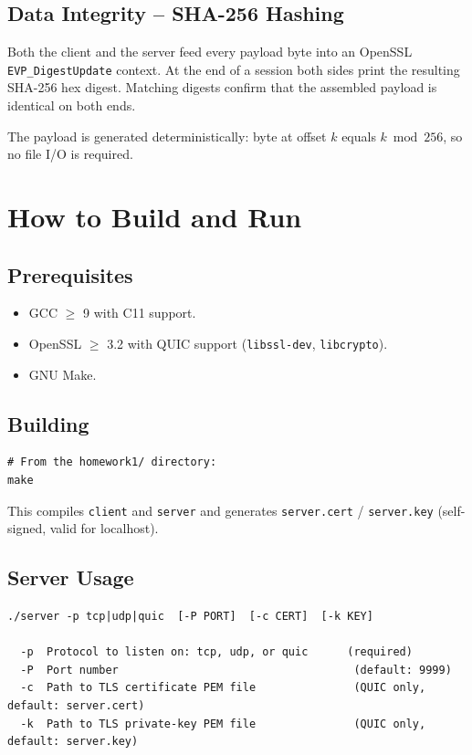 \documentclass[12pt,a4paper]{article}
\begin{document}
\subsection{Data Integrity – SHA-256 Hashing}

Both the client and the server feed every payload byte into an OpenSSL
\texttt{EVP\_DigestUpdate} context. At the end of a session both sides print
the resulting SHA-256 hex digest. Matching digests confirm that the assembled
payload is identical on both ends.

The payload is generated deterministically: byte at offset $k$ equals
$k \bmod 256$, so no file I/O is required.

\section{How to Build and Run}
\label{sec:usage}

\subsection{Prerequisites}

\begin{itemize}
  \item GCC $\geq$ 9 with C11 support.
  \item OpenSSL $\geq$ 3.2 with QUIC support
        (\texttt{libssl-dev}, \texttt{libcrypto}).
  \item GNU Make.
\end{itemize}

\subsection{Building}

\begin{lstlisting}
# From the homework1/ directory:
make
\end{lstlisting}

This compiles \texttt{client} and \texttt{server} and generates
\texttt{server.cert} / \texttt{server.key} (self-signed, valid for localhost).

\subsection{Server Usage}

\begin{lstlisting}
./server -p tcp|udp|quic  [-P PORT]  [-c CERT]  [-k KEY]

  -p  Protocol to listen on: tcp, udp, or quic      (required)
  -P  Port number                                    (default: 9999)
  -c  Path to TLS certificate PEM file               (QUIC only, default: server.cert)
  -k  Path to TLS private-key PEM file               (QUIC only, default: server.key)
\end{lstlisting}
\end{document}
